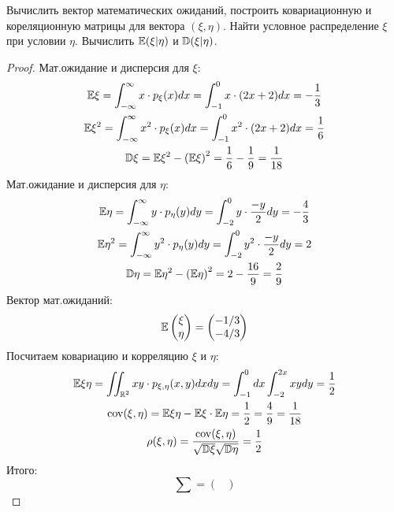 \begin{problem}
Вычислить вектор математических ожиданий, построить ковариационную и кореляционную матрицы для вектора $(\xi,\eta)$. Найти условное распределение $\xi$ при условии $\eta$. Вычислить $\mathbb E(\xi | \eta)$ и $\mathbb D(\xi | \eta)$.
\end{problem}

\begin{proof}
Мат.ожидание и дисперсия для $\xi$:
\begin{gather*}
    \mathbb E\xi = \int_{-\infty}^{\infty}x\cdot p_{\xi}(x)dx = \int_{-1}^{0}x\cdot(2x + 2)dx = -\frac{1}{3}\\
    \mathbb E\xi^2 = \int_{-\infty}^{\infty}x^2\cdot p_{\xi}(x)dx = \int_{-1}^{0}x^2\cdot(2x + 2)dx = \frac{1}{6}\\
    \mathbb D\xi = \mathbb E\xi^2 - \left(\mathbb E\xi\right)^2 = \frac{1}{6} - \frac{1}{9} = \frac{1}{18}
\end{gather*}
Мат.ожидание и дисперсия для $\eta$:
\begin{gather*}
    \mathbb E\eta = \int_{-\infty}^{\infty}y\cdot p_{\eta}(y)dy = \int_{-2}^{0}y\cdot\frac{-y}{2}dy = -\frac{4}{3}\\
    \mathbb E\eta^2 = \int_{-\infty}^{\infty}y^2\cdot p_{\eta}(y)dy = \int_{-2}^{0}y^2\cdot\frac{-y}{2}dy = 2\\
    \mathbb D\eta = \mathbb E\eta^2 - \left(\mathbb E\eta\right)^2 = 2 - \frac{16}{9} = \frac{2}{9}
\end{gather*}
Вектор мат.ожиданий:\\
\[
\mathbb E\begin{pmatrix} \xi \\ \eta \end{pmatrix} = \begin{pmatrix} -1/3 \\ -4/3 \end{pmatrix}
\]
Посчитаем ковариацию и корреляцию $\xi$ и $\eta$:
\begin{gather*}
\mathbb E\xi\eta = \iint_{\operatorname{\mathbb{R}}^2}xy\cdot p_{\xi,\eta}(x,y)dxdy = \int_{-1}^{0}dx\int_{-2}^{2x}xydy = \frac{1}{2}\\
\operatorname{\mathop{cov}}(\xi, \eta) = \mathbb E\xi\eta - \mathbb E\xi\cdot\mathbb E\eta = \frac{1}{2} = \frac{4}{9} = \frac{1}{18}\\
\rho(\xi,\eta) = \frac{\operatorname{\mathop{cov}}(\xi,\eta)}{\sqrt{\mathbb D\xi}\sqrt{\mathbb D\eta}} = \frac{1}{2}
\end{gather*}
Итого:
\[
\sum = \begin{pmatrix}

\end{pmatrix}\]
\end{proof}
